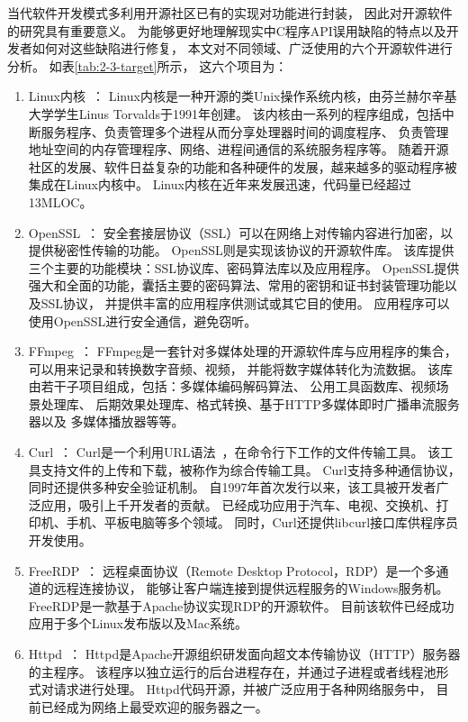 当代软件开发模式多利用开源社区已有的实现对功能进行封装，
因此对开源软件的研究具有重要意义。
为能够更好地理解现实中C程序API误用缺陷的特点以及开发者如何对这些缺陷进行修复，
本文对不同领域、广泛使用的六个开源软件进行分析。
如表\ref{tab:2-3-target}所示，
这六个项目为：
\begin{enumerate}
	\item Linux内核~\cite{linux}：
	Linux内核是一种开源的类Unix操作系统内核，由芬兰赫尔辛基大学学生Linus Torvalds于1991年创建。
	该内核由一系列的程序组成，包括中断服务程序、负责管理多个进程从而分享处理器时间的调度程序、
	负责管理地址空间的内存管理程序、网络、进程间通信的系统服务程序等。
	随着开源社区的发展、软件日益复杂的功能和各种硬件的发展，越来越多的驱动程序被集成在Linux内核中。
	Linux内核在近年来发展迅速，代码量已经超过13MLOC。
	
	\item OpenSSL~\cite{openssl}：
	安全套接层协议（SSL）可以在网络上对传输内容进行加密，以提供秘密性传输的功能。
	OpenSSL则是实现该协议的开源软件库。
	该库提供三个主要的功能模块：SSL协议库、密码算法库以及应用程序。
	OpenSSL提供强大和全面的功能，囊括主要的密码算法、常用的密钥和证书封装管理功能以及SSL协议，
	并提供丰富的应用程序供测试或其它目的使用。
	应用程序可以使用OpenSSL进行安全通信，避免窃听。
	
	
	\item FFmpeg~\cite{ffmpeg}：
	FFmpeg是一套针对多媒体处理的开源软件库与应用程序的集合，
	可以用来记录和转换数字音频、视频，
	并能将数字媒体转化为流数据。
	该库由若干子项目组成，包括：多媒体编码解码算法、
	公用工具函数库、视频场景处理库、
	后期效果处理库、格式转换、基于HTTP多媒体即时广播串流服务器以及
	多媒体播放器等等。
	
	\item Curl~\cite{curl}：
	Curl是一个利用URL语法~\cite{url}，在命令行下工作的文件传输工具。
	该工具支持文件的上传和下载，被称作为综合传输工具。
	Curl支持多种通信协议，同时还提供多种安全验证机制。
	自1997年首次发行以来，该工具被开发者广泛应用，吸引上千开发者的贡献。
	已经成功应用于汽车、电视、交换机、打印机、手机、平板电脑等多个领域。
	同时，Curl还提供libcurl接口库供程序员开发使用。
	
	\item FreeRDP~\cite{freerdp}：
	远程桌面协议（Remote Desktop Protocol，RDP）是一个多通道的远程连接协议，
	能够让客户端连接到提供远程服务的Windows服务机。
	FreeRDP是一款基于Apache协议实现RDP的开源软件。
	目前该软件已经成功应用于多个Linux发布版以及Mac系统。
	
	
	\item Httpd~\cite{httpd}：
	Httpd是Apache开源组织研发面向超文本传输协议（HTTP）服务器的主程序。
	该程序以独立运行的后台进程存在，并通过子进程或者线程池形式对请求进行处理。
	Httpd代码开源，并被广泛应用于各种网络服务中，
	目前已经成为网络上最受欢迎的服务器之一。
	
\end{enumerate}


